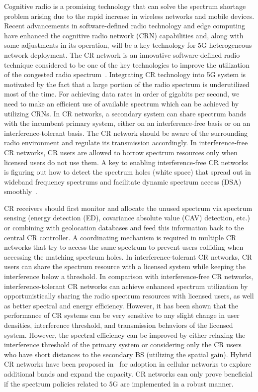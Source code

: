 Cognitive radio is a promising technology that can solve the spectrum shortage problem arising due to the rapid increase in wireless networks and mobile devices. Recent advancements in software-defined radio technology and edge computing have enhanced the cognitive radio network (CRN)  capabilities and, along with some adjustments in its operation, will be a key technology for 5G heterogeneous network deployment.  The CR network is an innovative software-defined radio technique considered to be one of the key technologies to improve the utilization of the congested radio spectrum~\cite{rusek2013scaling}. Integrating CR technology into 5G system is motivated by the fact that a large portion of the radio spectrum is underutilized most of the time. For achieving data rates in order of gigabits per second, we need to make an efficient use of available spectrum which can be achieved by utilizing CRNs. In CR networks, a secondary system can share spectrum bands with the incumbent primary system, either on an interference-free basis or on an interference-tolerant basis. The CR network should be aware of
the surrounding radio environment and regulate its transmission accordingly. In interference-free CR networks, CR users are allowed to borrow spectrum resources only when licensed users do
not use them. A key to enabling interference-free CR networks is figuring out how to detect the spectrum holes (white space) that spread out in wideband frequency spectrums and facilitate dynamic spectrum access (DSA) smoothly~\cite{wyglinski2009cognitive}. 

CR receivers should first monitor and allocate the unused spectrum via spectrum sensing (energy detection (ED), covariance absolute value (CAV) detection, etc.) or combining with geolocation databases and feed this information back to the central CR controller. A coordinating mechanism is required in multiple CR networks that try to access the same spectrum to prevent users colliding when accessing the matching spectrum holes. In interference-tolerant CR networks, CR users can share the spectrum resource with a licensed system while keeping the interference below a threshold. In comparison with interference-free CR networks, interference-tolerant CR networks can achieve enhanced spectrum utilization by opportunistically sharing the radio spectrum resources with licensed users, as well as better spectral and energy efficiency. However, it has been shown that the performance of CR systems can be very sensitive to any slight change in user densities, interference threshold, and transmission behaviors of the licensed system. However, the spectral efficiency can be improved by either relaxing the interference threshold of the primary system or considering only the CR users who have short distances to the secondary BS (utilizing the spatial gain). Hybrid CR networks have been proposed in~\cite{hong2010capacity} for adoption in cellular networks to explore additional bands and expand the capacity. CR networks can only prove beneficial if the spectrum policies related to 5G are implemented in a robust manner. 

